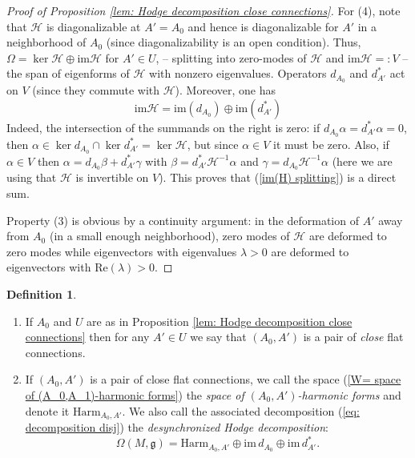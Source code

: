 \documentclass[11pt,a4paper]{amsart}
\theoremstyle{plain} %
\theoremstyle{definition}
\newtheorem{defn}[thm]{Definition}
\theoremstyle{remark}
\newcommand{\g}{\mathfrak{g}}
\newcommand{\mr}{\mathrm}
\newcommand{\HHH}{\mathcal{H}}
\begin{document}
{\begin{proof}[Proof of Proposition \ref{lem: Hodge decomposition close connections}]
For (4), note that $\HHH$ is diagonalizable at $A'=A_0$ and hence is diagonalizable for $A'$ in a neighborhood of $A_0$ (since diagonalizability is an open condition). Thus, $\Omega= \ker\HHH \oplus \mr{im}\HHH$ for $A'\in U$, -- splitting into zero-modes of $\HHH$ and $\mr{im}\HHH=\colon V$ -- the span of eigenforms of $\HHH$ with nonzero eigenvalues. Operators $d_{A_0}$ and $d^*_{A'}$ act on $V$ (since they commute with $\HHH$). Moreover, one has
\begin{equation}\label{im(H) splitting}
\mr{im}\HHH=\mr{im}(d_{A_0})\oplus \mr{im}(d^*_{A'}) 
\end{equation}
Indeed, the intersection of the summands on the right is zero: if $d_{A_0}\alpha=d^*_{A'}\alpha=0$, then $\alpha\in \ker d_{A_0}\cap \ker d^*_{A'}=\ker\HHH$, but since $\alpha\in V$ it must be zero.  Also, if $\alpha\in V$ then $\alpha=d_{A_0} \beta + d^*_{A'}\gamma$ with $\beta=d^*_{A'}\HHH^{-1}\alpha$  and $\gamma=d_{A_0}\HHH^{-1}\alpha$ (here we are using that $\HHH$ is invertible on $V$). This proves that (\ref{im(H) splitting}) is a direct sum.

Property (3) is obvious by a continuity argument: in the deformation of $A'$ away from $A_0$ (in a small enough neighborhood), zero modes of $\HHH$ are deformed to zero modes while eigenvectors with eigenvalues $\lambda>0$ are deformed to eigenvectors with $\mr{Re}(\lambda)>0$.
\end{proof}



\begin{defn}\label{def: close connections}
\begin{enumerate} %
\item If $A_0$ and $U$ are as in Proposition \ref{lem: Hodge decomposition close connections} then for any $A' \in U$ we say that $(A_0, A')$ is a pair of \emph{close} flat connections. 
\item If $(A_0,A')$ is a pair of close flat connections, we call the space (\ref{W= space of (A_0,A_1)-harmonic forms}) the \emph{space of $(A_0,A')$-harmonic forms} and denote it $\mr{Harm}_{A_0,A'}$. 
We also call the associated decomposition (\ref{eq: decomposition disj}) the \emph{desynchronized Hodge decomposition}:
\begin{equation}
    \Omega(M,\g)=\mr{Harm}_{A_0,A'}\oplus \mr{im}\, d_{A_0} \oplus \mr{im}\, d^*_{A'}.
\end{equation}
\end{enumerate}
\end{defn}

}
\end{document}
